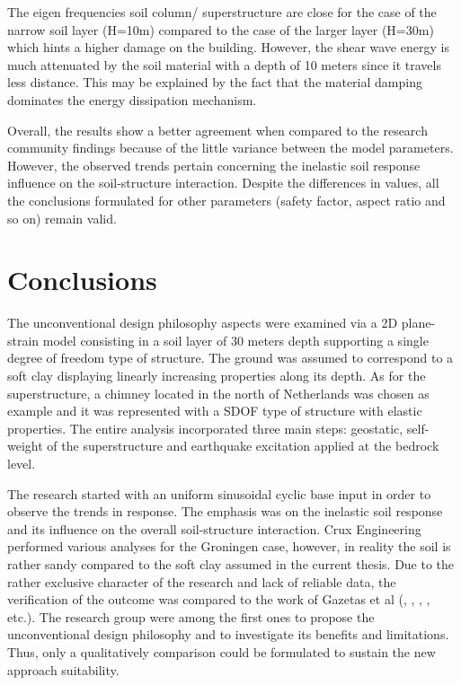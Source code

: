 The eigen frequencies soil column/ superstructure are close for the case of the narrow soil layer (H=10m) compared to the case of the larger layer (H=30m) which hints a higher damage on the building. However, the shear wave energy is much attenuated by the soil material with a depth of 10 meters since it travels less distance. This may be explained by the fact that the material damping dominates the energy dissipation mechanism.


Overall, the results show a better agreement when compared to the research community findings because of the little variance between the model parameters. However, the observed trends pertain concerning the inelastic soil response influence on the soil-structure interaction. Despite the differences in values, all the conclusions formulated for other parameters (safety factor, aspect ratio and so on) remain valid.

\newpage
\section{Conclusions}
The unconventional design philosophy aspects were examined via a 2D plane-strain model consisting in a soil layer of 30 meters depth supporting a single degree of freedom type of structure. The ground was assumed to correspond to a soft clay displaying linearly increasing properties along its depth. As for the superstructure, a chimney located in the north of Netherlands was chosen as example and it was represented with a SDOF type of structure with elastic properties. The entire analysis incorporated three main steps: geostatic, self-weight of the superstructure and earthquake excitation applied at the bedrock level. 

The research started with an uniform sinusoidal cyclic base input in order to observe the trends in response. The emphasis was on the inelastic soil response and its influence on the overall soil-structure interaction. Crux Engineering performed various analyses for the Groningen case, however, in reality the soil is rather sandy compared to the soft clay assumed in the current thesis. Due to the rather exclusive character of the research and lack of reliable data, the verification of the outcome was compared to the work of Gazetas et al (\cite{gazetas2004nonlinear}, \cite{anastasopoulos2010soil}, \cite{anastasopoulos2014simplified}, \cite{drosos2012soil}, etc.). The research group were among the first ones to propose the unconventional design philosophy and to investigate its benefits and limitations. Thus, only a qualitatively comparison could be formulated to sustain the new approach suitability.

